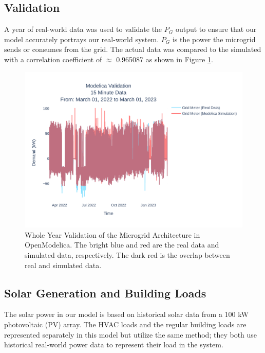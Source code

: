 \documentclass[conference, usletter]{IEEEtran}
\begin{document}
	\subsection{Validation}
A year of real-world data was used to validate the $P_G $ output to ensure that our model accurately portrays our real-world system. $P_G$ is the power the microgrid sends or consumes from the grid. The actual data was compared to the simulated with a correlation coefficient of  $\approx$ 0.965087 as shown in Figure \ref{fig:ucr15minutedatamar012022tomar012023}. 
\begin{figure}
	\centering
	\includegraphics[width=0.9\linewidth]{Fig/ucr_15_Minute_Data_Mar_01_2022_to_Mar_01_2023}
	\caption{\footnotesize Whole Year Validation of the Microgrid Architecture in OpenModelica. The bright blue and red are the real data and simulated data, respectively. The dark red is the overlap between real and simulated data.} %
\label{fig:ucr15minutedatamar012022tomar012023}
\end{figure}
\subsection{Solar Generation and Building Loads}
The solar power in our model is based on historical solar data from a 100 kW photovoltaic (PV) array. The HVAC loads and the regular building loads are represented separately in this model but utilize the same method; they both use historical real-world power data to represent their load in the system. 
\end{document}
